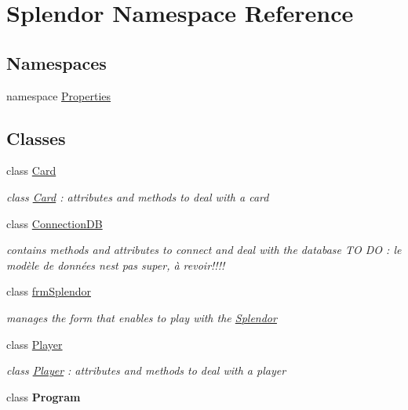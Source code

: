 \hypertarget{namespace_splendor}{}\section{Splendor Namespace Reference}
\label{namespace_splendor}
\subsection*{Namespaces}
\begin{DoxyCompactItemize}
\item 
namespace \hyperlink{namespace_splendor_1_1_properties}{Properties}
\end{DoxyCompactItemize}
\subsection*{Classes}
\begin{DoxyCompactItemize}
\item 
class \hyperlink{class_splendor_1_1_card}{Card}
\begin{DoxyCompactList}\small\item\em class \hyperlink{class_splendor_1_1_card}{Card} \+: attributes and methods to deal with a card \end{DoxyCompactList}\item 
class \hyperlink{class_splendor_1_1_connection_d_b}{Connection\+DB}
\begin{DoxyCompactList}\small\item\em contains methods and attributes to connect and deal with the database TO DO \+: le modèle de données n\textquotesingle{}est pas super, à revoir!!!! \end{DoxyCompactList}\item 
class \hyperlink{class_splendor_1_1frm_splendor}{frm\+Splendor}
\begin{DoxyCompactList}\small\item\em manages the form that enables to play with the \hyperlink{namespace_splendor}{Splendor} \end{DoxyCompactList}\item 
class \hyperlink{class_splendor_1_1_player}{Player}
\begin{DoxyCompactList}\small\item\em class \hyperlink{class_splendor_1_1_player}{Player} \+: attributes and methods to deal with a player \end{DoxyCompactList}\item 
class {\bfseries Program}
\end{DoxyCompactItemize}
